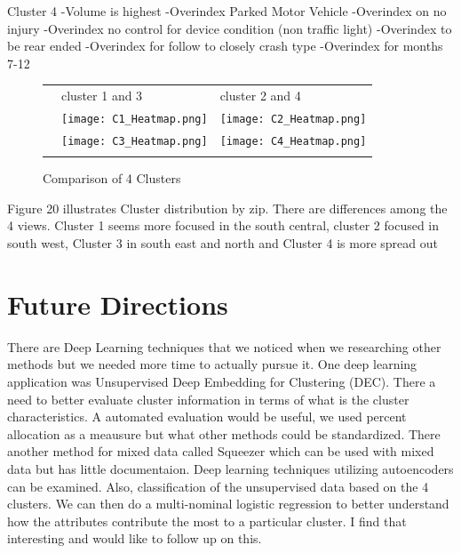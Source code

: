 \documentclass[conference]{IEEEtran}
\begin{document}
\begin{center}
Cluster 4 \linebreak
-Volume is highest 
-Overindex Parked Motor Vehicle
-Overindex on no injury 
-Overindex no control for device condition (non traffic light) 
-Overindex to be rear ended 
-Overindex for follow to closely crash type 
-Overindex for months 7-12 


\begin{figure}[h!]
	
	\caption{Comparison of 4 Clusters} %
	\bigskip
	\centering
	\begin{tabular}{@{} r @{} *{2}{M{0.13\textheight}} @{}}
	&    cluster 1 and 3 & cluster 2 and 4 \\
	\llap{\quad} & \texttt{[image: C1\_Heatmap.png]} & \texttt{[image: C2\_Heatmap.png]} \\ \addlinespace

	\llap{\quad} & \texttt{[image: C3\_Heatmap.png]} & \texttt{[image: C4\_Heatmap.png]} \\ \addlinespace
 
	\end{tabular}
	\end{figure}

Figure 20 illustrates Cluster distribution by zip.  There are differences among the 4 views. Cluster 1 seems more focused in the south central, cluster 2 focused in south west, Cluster 3 in south east and north and Cluster 4 is more spread out	

\section{Future Directions}
There are Deep Learning techniques that we noticed when we researching other methods but we needed more time to actually pursue it.  One deep learning application was Unsupervised Deep Embedding for Clustering (DEC).  There a need to better evaluate cluster information in terms of what is the cluster characteristics.  A automated evaluation would be useful, we used percent allocation as a meausure but what other methods could be standardized.  There another method for mixed data called Squeezer which can be used with mixed data but has little documentaion.  Deep learning techniques utilizing autoencoders can be examined.  Also, classification of the unsupervised data based on the 4 clusters.  We can then do a multi-nominal logistic regression to better understand how the attributes contribute the most to a particular cluster.  I find that interesting and would like to follow up on this. 

\end{center}
\end{document}
